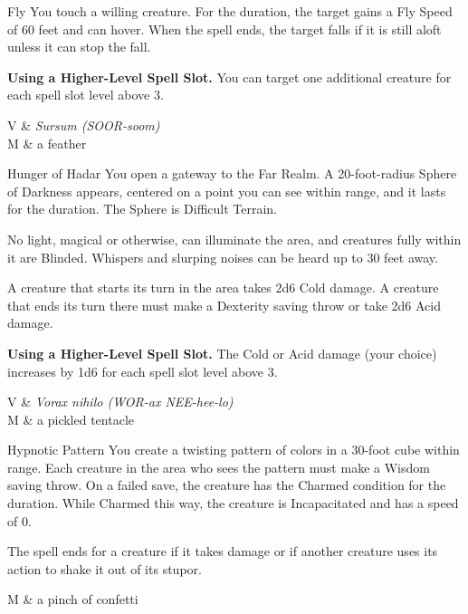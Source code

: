 \begin{Spell}[
  tags=Concentration,
  level={3rd},
  time={1 Action},
  range={Touch},
  components={V, S, M},
  duration={10 minutes},
  school={Transmutation},
  attack={None},
  effect={Movement}
]{Fly}
You touch a willing creature. For the duration, the target gains a Fly Speed of 60 feet and can hover. When the spell ends, the target falls if it is still aloft unless it can stop the fall.

\textbf{Using a Higher-Level Spell Slot.} You can target one additional creature for each spell slot level above 3.

\begin{components}
V & \textit{Sursum (SOOR-soom)} \\
M & a feather
\end{components}
\end{Spell}

\begin{Spell}[
  tags=Concentration,
  level={3rd},
  time={1 action},
  range={150 ft/20 ft r sphere},
  components={V, S, M},
  duration={1 minute},
  school={Conjuration},
  attack={DEX Save},
  effect={Damage, Control}
]{Hunger of Hadar}
You open a gateway to the Far Realm. A 20-foot-radius Sphere of Darkness appears, centered on a point you can see within range, and it lasts for the duration. The Sphere is Difficult Terrain.

No light, magical or otherwise, can illuminate the area, and creatures fully within it are Blinded. Whispers and slurping noises can be heard up to 30 feet away.

A creature that starts its turn in the area takes 2d6 Cold damage. A creature that ends its turn there must make a Dexterity saving throw or take 2d6 Acid damage.

\textbf{Using a Higher-Level Spell Slot.} The Cold or Acid damage (your choice) increases by 1d6 for each spell slot level above 3.

\begin{components}
V & \textit{Vorax nihilo (WOR-ax NEE-hee-lo)} \\
M & a pickled tentacle
\end{components}
\end{Spell}


\begin{Spell}[
  tags=Concentration,
  level={3rd},
  time={1 action},
  range={120 ft/30 ft cube},
  components={S, M},
  duration={1 minute},
  school={Illusion},
  attack={WIS Save},
  effect={Control}
]{Hypnotic Pattern}
You create a twisting pattern of colors in a 30-foot cube within range. Each creature in the area who sees the pattern must make a Wisdom saving throw. On a failed save, the creature has the Charmed condition for the duration. While Charmed this way, the creature is Incapacitated and has a speed of 0.

The spell ends for a creature if it takes damage or if another creature uses its action to shake it out of its stupor.

\begin{components}
M & a pinch of confetti
\end{components}
\end{Spell}


